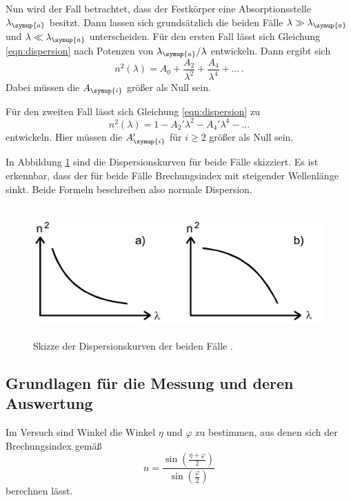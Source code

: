 Nun wird der Fall betrachtet, dass der Festkörper eine Absorptionsstelle
$\lambda_{\symup{a}}$ besitzt. Dann lassen sich grundsätzlich die beiden Fälle
$\lambda \gg \lambda_{\symup{a}}$ und $\lambda \ll \lambda_{\symup{a}}$ unterscheiden.
Für den ersten Fall lässt sich Gleichung \eqref{eqn:dispersion} nach Potenzen von
$\lambda_{\symup{a}}/\lambda$ entwickeln. Dann ergibt sich
\begin{equation}
  n^2(\lambda)=A_0+\frac{A_2}{\lambda^2}+\frac{A_4}{\lambda^4}+... \,.
  \label{eqn:fall1}
\end{equation}
Dabei müssen die $A_{\symup{i}}$ größer als Null sein.

Für den zweiten Fall lässt sich Gleichung \eqref{eqn:dispersion} zu
\begin{equation}
  n^2(\lambda)=1-A_2'\lambda^2-A_4'\lambda^4-...
  \label{eqn:fall2}
\end{equation}
entwickeln. Hier müssen die $A_{\symup{i}}'$ für $i≥2$ größer als Null sein.

In Abbildung \ref{fig:faelle} sind die Dispersionskurven für beide Fälle skizziert.
Es ist erkennbar, dass der für beide Fälle Brechungsindex mit steigender Wellenlänge
sinkt. Beide Formeln beschreiben also normale Dispersion.

\begin{figure}[H]
  \centering
  \includegraphics[height=5cm]{data/dispersionskurve.png}
  \caption{Skizze der Dispersionskurven der beiden Fälle \cite{Versuchsanleitung}.}
  \label{fig:faelle}
\end{figure}

\subsection{Grundlagen für die Messung und deren Auswertung}
\label{subsec:messung}

Im Versuch sind Winkel die Winkel $\eta$ und $\varphi$ zu bestimmen, aus denen sich
der Brechungsindex gemäß
\begin{equation}
  n=\frac{\sin\left(\frac{\eta+\varphi}{2}\right)}{\sin\left(\frac{\varphi}{2}\right)}
  \label{eqn:nauswinkeln}
\end{equation}
berechnen lässt.

